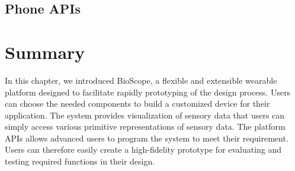 \subsection{Phone APIs}


\section{Summary}
In this chapter, we introduced BioScope, a flexible and extensible wearable platform designed to facilitate rapidly prototyping of the design process.
Users can choose the needed components to build a customized device for their application.
The system provides visualization of sensory data that users can simply access various primitive representations of sensory data.
The platform APIs allows advanced users to program the system to meet their requirement.
Users can therefore easily create a high-fidelity prototype for evaluating and testing required functions in their design.

\let\cleardoublepage\clearpage
